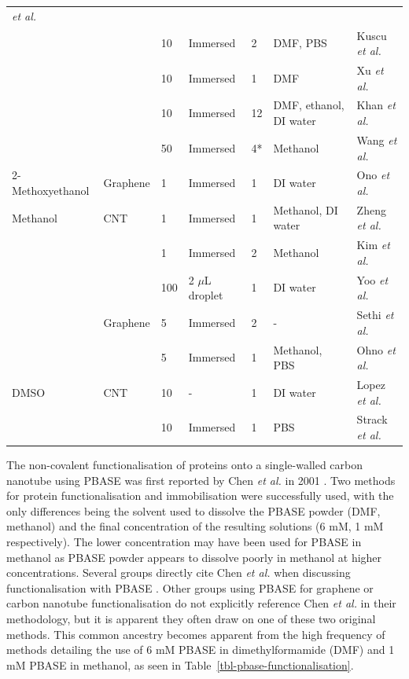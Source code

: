 \documentclass[
  a4paper,
]{scrbook}
\begin{document}
\begin{longtable}[]{@{}lllllll@{}}
\textit{et al.} \cite{Campos2019} \\
& & 10 & Immersed & 2 & DMF, PBS & Kuscu \textit{et al.}
\cite{Kuscu2020} \\
& & 10 & Immersed & 1 & DMF & Xu \textit{et al.} \cite{Xu2017} \\
& & 10 & Immersed & 12 & DMF, ethanol, DI water & Khan \textit{et al.}
\cite{Khan2020} \\
& & 50 & Immersed & 4* & Methanol & Wang \textit{et al.}
\cite{Wang2020} \\
2-Methoxyethanol & Graphene & 1 & Immersed & 1 & DI water & Ono
\textit{et al.} \cite{Ono2020} \\
Methanol & CNT & 1 & Immersed & 1 & Methanol, DI water & Zheng
\textit{et al.} \cite{Zheng2016} \\
& & 1 & Immersed & 2 & Methanol & Kim \textit{et al.} \cite{Kim2009} \\
& & 100 & 2 \(\mu\)L droplet & 1 & DI water & Yoo \textit{et al.}
\cite{Yoo2022} \\
& Graphene & 5 & Immersed & 2 & - & Sethi \textit{et al.}
\cite{Sethi2020} \\
& & 5 & Immersed & 1 & Methanol, PBS & Ohno \textit{et al.}
\cite{Ohno2010} \\
DMSO & CNT & 10 & - & 1 & DI water & Lopez \textit{et al.}
\cite{Lopez2015} \\
& & 10 & Immersed & 1 & PBS & Strack \textit{et al.}
\cite{Strack2013} \\
\end{longtable}

\newpage
{}

The non-covalent functionalisation of proteins onto a single-walled
carbon nanotube using PBASE was first reported by Chen \emph{et al.} in
2001 \autocite{Chen2001}. Two methods for protein functionalisation and
immobilisation were successfully used, with the only differences being
the solvent used to dissolve the PBASE powder (DMF, methanol) and the
final concentration of the resulting solutions (6 mM, 1 mM
respectively). The lower concentration may have been used for PBASE in
methanol as PBASE powder appears to dissolve poorly in methanol at
higher concentrations. Several groups directly cite Chen \emph{et al.}
when discussing functionalisation with PBASE
\autocite{Besteman2003,Cella2010,Campos2019,Zheng2016,Ohno2010}. Other
groups using PBASE for graphene or carbon nanotube functionalisation do
not explicitly reference Chen \emph{et al.} in their methodology, but it
is apparent they often draw on one of these two original methods. This
common ancestry becomes apparent from the high frequency of methods
detailing the use of 6 mM PBASE in dimethylformamide (DMF) and 1 mM
PBASE in methanol, as seen in Table~\ref{tbl-pbase-functionalisation}.
\end{document}
